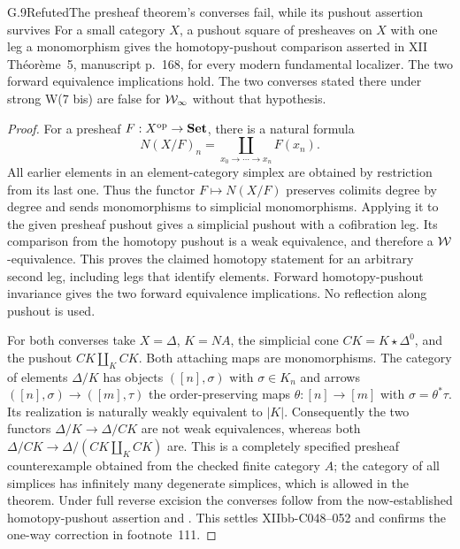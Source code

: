 \begin{claim}{G.9}{Refuted}{The presheaf theorem's converses fail, while its pushout assertion survives}
For a small category $X$, a pushout square of presheaves on $X$ with one leg a monomorphism gives the homotopy-pushout comparison asserted in XII Th\'eor\`eme~5, manuscript p.~168, for every modern fundamental localizer. The two forward equivalence implications hold. The two converses stated there under strong W(7 bis) are false for $\mathcal{W}_{\infty}$ without that hypothesis.
\end{claim}
\begin{proof}
For a presheaf $F:X^{\mathrm{op}}\to\mathbf{Set}$, there is a natural formula
\[
 N(X/F)_n=\coprod_{x_0\to\cdots\to x_n}F(x_n).
\]
All earlier elements in an element-category simplex are obtained by restriction from its last one. Thus the functor $F\mapsto N(X/F)$ preserves colimits degree by degree and sends monomorphisms to simplicial monomorphisms. Applying it to the given presheaf pushout gives a simplicial pushout with a cofibration leg. Its comparison from the homotopy pushout is a weak equivalence, and therefore a $\mathcal{W}$-equivalence. This proves the claimed homotopy statement for an arbitrary second leg, including legs that identify elements. Forward homotopy-pushout invariance gives the two forward equivalence implications. No reflection along pushout is used.

For both converses take $X=\Delta$, $K=NA$, the simplicial cone $CK=K\star\Delta^0$, and the pushout $CK\amalg_K CK$. Both attaching maps are monomorphisms. The category of elements $\Delta/K$ has objects $([n],\sigma)$ with $\sigma\in K_n$ and arrows $([n],\sigma)\to([m],\tau)$ the order-preserving maps $\theta:[n]\to[m]$ with $\sigma=\theta^*\tau$. Its realization is naturally weakly equivalent to $|K|$. Consequently the two functors $\Delta/K\to\Delta/CK$ are not weak equivalences, whereas both $\Delta/CK\to\Delta/(CK\amalg_K CK)$ are. This is a completely specified presheaf counterexample obtained from the checked finite category $A$; the category of all simplices has infinitely many degenerate simplices, which is allowed in the theorem. Under full reverse excision the converses follow from the now-established homotopy-pushout assertion and . This settles XIIbb-C048--052 and confirms the one-way correction in footnote~111.
\end{proof}

